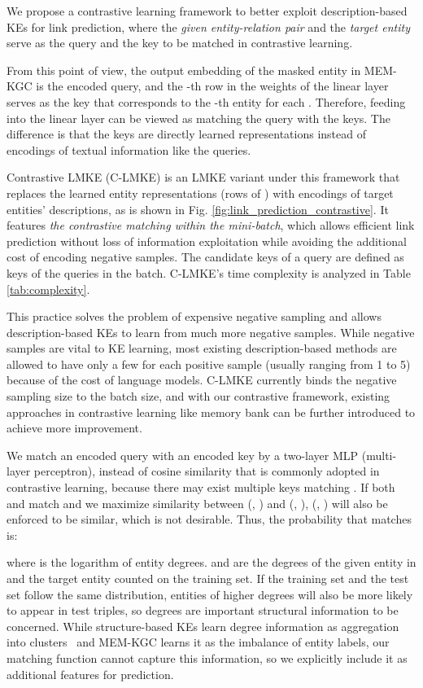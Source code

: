 \documentclass{article}
\newcommand{\wxt}[1]{{#1}}
\begin{document}
We propose a contrastive learning framework to \wxt{better exploit} description-based KEs for link prediction,
where the \emph{given entity-relation pair} and the \emph{target entity} serve as the query  and the key  to be matched in contrastive learning. 





From this point of view, the output embedding  of the masked entity in MEM-KGC is the encoded query, and the -th row in the weights  of the linear layer serves as the key that corresponds to the -th entity for each .
Therefore, feeding  into the linear layer can be viewed as matching the query  with the keys. 
The difference is that the keys are directly learned representations instead of encodings of textual information like the queries. 

Contrastive LMKE (C-LMKE) is an LMKE variant under this framework that replaces the learned entity representations (rows of ) with encodings of target entities' descriptions, as is shown in Fig. \ref{fig:link_prediction_contrastive}. 
\wxt{It features \emph{the contrastive matching within the mini-batch}, which allows efficient link prediction without loss of information exploitation while avoiding the additional
cost of encoding negative samples.}
The candidate keys of a query are defined as keys of the queries in the batch.
C-LMKE's time complexity is analyzed in Table \ref{tab:complexity}.

This practice solves the problem of expensive negative sampling and allows description-based KEs to learn from much more negative samples.
While negative samples are vital to KE learning, most existing description-based methods are allowed to have only a few for each positive sample (usually ranging from 1 to 5) because of the cost of language models. 
C-LMKE currently binds the negative sampling size to the batch size,
and with our contrastive framework, existing approaches in contrastive learning like memory bank can be further introduced to achieve more improvement.

We match an encoded query  with an encoded key  by a two-layer MLP (multi-layer perceptron), instead of cosine similarity that is commonly adopted in contrastive learning, because there may exist multiple keys matching .
If both  and  match  and we maximize similarity between (, ) and (, ), (, ) will also be enforced to be similar, which is not desirable. 
Thus, the probability that  matches  is:

where   is the logarithm of entity degrees.
 and  are the degrees of the given entity in  and the target entity  counted on the training set. 
If the training set and the test set follow the same distribution, 
entities of higher degrees will also be more likely to appear in test triples,
so degrees are important structural information to be concerned.
While structure-based KEs learn degree information as aggregation into clusters~\cite{pei2019semi} and MEM-KGC learns it as the imbalance of entity labels, our matching function cannot capture this information, so we explicitly include it as additional features for prediction. 
\end{document}

